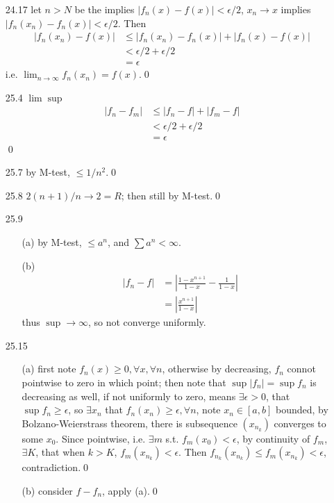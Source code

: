 \documentclass[paper=a4, fontsize=11pt]{scrartcl} %
\numberwithin{equation}{section} %
\numberwithin{figure}{section} %
\numberwithin{table}{section} %
\begin{document}
\begin{itemize}
\begin{equation}
\begin{split}
	&< \epsilon/3 + \epsilon/3 + \epsilon/3 \\
	&= \epsilon
	\end{split}
	\end{equation}
	i.e. $f$ is uniformly continuous.\qed
\item[24.17] let $n>N$ be the implies $|f_n(x)-f(x)|<\epsilon/2$, $x_n\rightarrow x$ implies $|f_n(x_n)-f_n(x)|<\epsilon/2$. Then
\begin{equation}\begin{split}
	|f_n(x_n) - f(x)| &\leq |f_n(x_n)-f_n(x)| + |f_n(x)-f(x)| \\
	 &< \epsilon/2 + \epsilon/2 \\
	 &= \epsilon
\end{split}
	\end{equation}
i.e. $\lim_{n\rightarrow\infty} f_n(x_n) = f(x)$.\qed
\item[25.4] $\lim\sup$
\begin{equation}\begin{split}
	|f_n - f_m| &\leq |f_n -f| + |f_m -f| \\
	&< \epsilon/2 + \epsilon/2 \\
	&= \epsilon
\end{split}
	\end{equation}\qed
\item[25.7] by M-test, $\leq 1/n^2$.\qed
\item[25.8] $2(n+1)/n \rightarrow 2=R$; then still by M-test.\qed
\item[25.9] \begin{itemize}
	\item[(a)] by M-test, $\leq a^n$, and $\sum a^n<\infty$.
	\item[(b)] \begin{equation}\begin{split}
		|f_n - f | &= |\frac{1-x^{n+1}}{1-x} - \frac{1}{1-x}| \\
			& = |\frac{x^{n+1}}{1-x}|
	\end{split}
	\end{equation}
	thus $\sup\rightarrow \infty$, so not converge uniformly.
	\end{itemize}
\item[25.15]\begin{itemize}
	\item[(a)] first note $f_n(x)\geq 0, \forall x,\forall n$, otherwise by decreasing, $f_n$ connot pointwise to zero in which point; then note that $\sup|f_n| = \sup f_n$ is decreasing as well, if not uniformly to zero, means $\exists \epsilon>0$, that $\sup f_n\geq \epsilon$, so $\exists x_n$ that $f_n(x_n)\geq \epsilon, \forall n$, note $x_n\in[a,b]$ bounded, by Bolzano-Weierstrass theorem, there is subsequence $(x_{n_k})$ converges to some $x_0$. Since pointwise, i.e. $\exists m$ s.t. $f_m(x_0)<\epsilon$, by continuity of $f_m$, $\exists K$, that when $k>K$, $f_m(x_{n_k})<\epsilon$. Then $f_{n_k}(x_{n_k}) \leq f_m(x_{n_k})<\epsilon$, contradiction.\qed 
	\item[(b)] consider $f-f_n$, apply (a).\qed
	\end{itemize}
\end{itemize}
\end{document}
